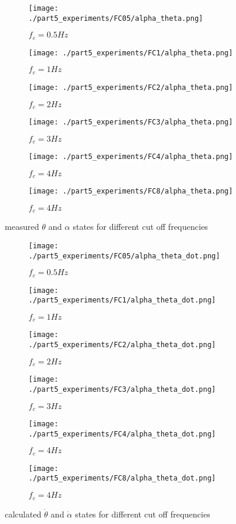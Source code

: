 \begin{figure}[H]
	\centering
	\begin{subfigure}[b]{0.45\textwidth}
		\texttt{[image: ./part5\_experiments/FC05/alpha\_theta.png]}
		\caption{$f_c=0.5Hz$}
	\end{subfigure}
	\begin{subfigure}[b]{0.45\textwidth}
		\texttt{[image: ./part5\_experiments/FC1/alpha\_theta.png]}
		\caption{$f_c=1Hz$}
	\end{subfigure}
	\begin{subfigure}[b]{0.45\textwidth}
		\texttt{[image: ./part5\_experiments/FC2/alpha\_theta.png]}
		\caption{$f_c=2Hz$}
	\end{subfigure}
	\begin{subfigure}[b]{0.45\textwidth}
		\texttt{[image: ./part5\_experiments/FC3/alpha\_theta.png]}
		\caption{$f_c=3Hz$}
	\end{subfigure}
	\begin{subfigure}[b]{0.45\textwidth}
		\texttt{[image: ./part5\_experiments/FC4/alpha\_theta.png]}
		\caption{$f_c=4Hz$}
	\end{subfigure}
	\begin{subfigure}[b]{0.45\textwidth}
		\texttt{[image: ./part5\_experiments/FC8/alpha\_theta.png]}
		\caption{$f_c=4Hz$}
	\end{subfigure}
	\caption{measured $\theta$ and $\alpha$ states for different cut off frequencies}
\end{figure}
\begin{figure}[H]
	\centering
	\begin{subfigure}[b]{0.45\textwidth}
		\texttt{[image: ./part5\_experiments/FC05/alpha\_theta\_dot.png]}
		\caption{$f_c=0.5Hz$}
	\end{subfigure}
	\begin{subfigure}[b]{0.45\textwidth}
		\texttt{[image: ./part5\_experiments/FC1/alpha\_theta\_dot.png]}
		\caption{$f_c=1Hz$}
	\end{subfigure}
	\begin{subfigure}[b]{0.45\textwidth}
		\texttt{[image: ./part5\_experiments/FC2/alpha\_theta\_dot.png]}
		\caption{$f_c=2Hz$}
	\end{subfigure}
	\begin{subfigure}[b]{0.45\textwidth}
		\texttt{[image: ./part5\_experiments/FC3/alpha\_theta\_dot.png]}
		\caption{$f_c=3Hz$}
	\end{subfigure}
	\begin{subfigure}[b]{0.45\textwidth}
		\texttt{[image: ./part5\_experiments/FC4/alpha\_theta\_dot.png]}
		\caption{$f_c=4Hz$}
	\end{subfigure}
	\begin{subfigure}[b]{0.45\textwidth}
		\texttt{[image: ./part5\_experiments/FC8/alpha\_theta\_dot.png]}
		\caption{$f_c=4Hz$}
	\end{subfigure}
	\caption{calculated $\dot{\theta}$ and $\dot{\alpha}$ states for different cut off frequencies}
\end{figure}

